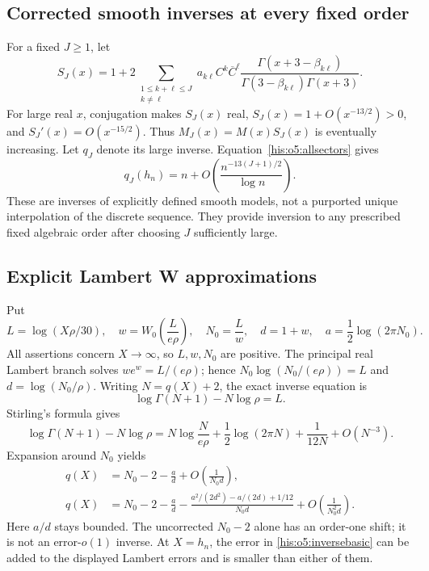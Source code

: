 \documentclass[11pt]{article}
\theoremstyle{remark}\newtheorem{remark}[theorem]{Remark}
\numberwithin{equation}{section}
\begin{document}
\subsection{Corrected smooth inverses at every fixed order}
For a fixed $J\ge1$, let
\[
S_J(x)=1+2\!\sum_{\substack{1\le k+\ell\le J\\k\ne\ell}}
 a_{k\ell}C^k\overline C^\ell
 \frac{\Gamma(x+3-\beta_{k\ell})}
 {\Gamma(3-\beta_{k\ell})\Gamma(x+3)}.
\]
For large real $x$, conjugation makes $S_J(x)$ real,
$S_J(x)=1+O(x^{-13/2})>0$, and $S_J'(x)=O(x^{-15/2})$.
Thus $M_J(x)=M(x)S_J(x)$ is eventually increasing.
Let $q_J$ denote its large inverse. Equation~\eqref{his:o5:allsectors} gives
\begin{equation}\label{his:o5:inverseJ}
q_J(h_n)=n+O\!\left(\frac{n^{-13(J+1)/2}}{\log n}\right).
\end{equation}
These are inverses of explicitly defined smooth models, not a purported
unique interpolation of the discrete sequence.
They provide inversion to any prescribed fixed algebraic order after
choosing $J$ sufficiently large.

\subsection{Explicit Lambert W approximations}
Put
\begin{equation}\label{his:o5:Wdefinitions}
L=\log(X\rho/30),\quad
w=W_0\!\left(\frac{L}{e\rho}\right),\quad
N_0=\frac Lw,\quad d=1+w,\quad
 a=\frac12\log(2\pi N_0).
\end{equation}
All assertions concern $X\to\infty$, so $L,w,N_0$ are positive.
The principal real Lambert branch solves $we^w=L/(e\rho)$; hence
$N_0\log(N_0/(e\rho))=L$ and $d=\log(N_0/\rho)$.
Writing $N=q(X)+2$, the exact inverse equation is
\[
\log\Gamma(N+1)-N\log\rho=L.
\]
Stirling's formula gives
\begin{equation}\label{his:o5:stirling}
\log\Gamma(N+1)-N\log\rho
=N\log\!\frac{N}{e\rho}
+\frac12\log(2\pi N)+\frac1{12N}+O(N^{-3}).
\end{equation}
Expansion around $N_0$ yields
\begin{align}
q(X)&=N_0-2-\frac ad+O\!\left(\frac1{N_0d}\right),\label{his:o5:Wone}\\
q(X)&=N_0-2-\frac ad
-\frac{a^2/(2d^2)-a/(2d)+1/12}{N_0d}
+O\!\left(\frac1{N_0^2d}\right).\label{his:o5:Wtwo}
\end{align}
Here $a/d$ stays bounded. The uncorrected $N_0-2$ alone has an order-one
shift; it is not an error-$o(1)$ inverse.
At $X=h_n$, the error in \eqref{his:o5:inversebasic} can be added to the displayed
Lambert errors and is smaller than either of them.
\end{document}
